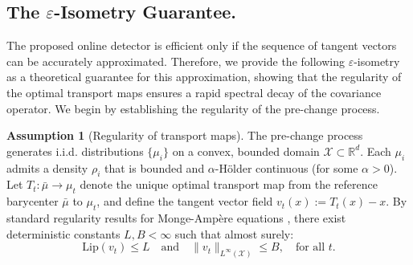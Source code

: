 \documentclass{article}
\newcommand{\algoname}{\textsc{IDD}\xspace}
\theoremstyle{plain}
\theoremstyle{definition}
\newtheorem{assumption}[theorem]{Assumption}
\theoremstyle{remark}
\begin{document}
\begin{algorithm}[t]
\caption{\algoname --- Online Monitoring}
\label{alg:monitoring}
\SetAlgoLined
\DontPrintSemicolon
{}


\BlankLine
{}
\end{algorithm}


\subsection{The $\varepsilon$-Isometry Guarantee.}\label{sec:theory_epsilon}
The proposed online detector is efficient only if the sequence of tangent vectors can be accurately approximated. 
Therefore, we provide the following $\varepsilon$-isometry as a theoretical guarantee for this approximation, showing that the regularity of the optimal transport maps ensures a rapid spectral decay of the covariance operator.
We begin by establishing the regularity of the pre-change process.

\begin{assumption}[Regularity of transport maps]
\label{ass:norm_bounds}
The pre-change process generates i.i.d. distributions $\{\mu_i\}$ on a convex, bounded domain $\mathcal{X}\subset\mathbb{R}^d$. 
Each $\mu_i$ admits a density $\rho_i$ that is bounded and $\alpha$-Hölder continuous (for some $\alpha > 0$).
Let $T_t: \bar\mu \to \mu_t$ denote the unique optimal transport map from the reference barycenter $\bar\mu$ to $\mu_t$, and define  the tangent vector field $v_t(x) := T_t(x)-x$.
By standard regularity results for Monge-Amp\`ere equations \citep{brenier1991polar, caffarelli1992regularity, caffarelli2000monotonicity}, there exist deterministic constants $L, B < \infty$ such that almost surely:
\begin{equation}\label{eq:lipschitz_bounds}
\text{Lip}(v_t) \le L \quad \text{and} \quad \|v_t\|_{L^\infty(\mathcal{X})} \le B,\quad \text{for all }t.
\end{equation}
\end{assumption}
\end{document}
